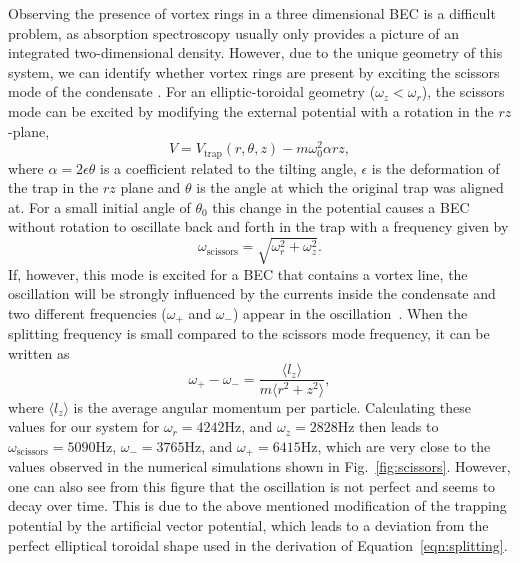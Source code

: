 Observing the presence of vortex rings in a three dimensional BEC is a difficult problem, as absorption spectroscopy usually only provides a picture of an integrated two-dimensional density.
However, due to the unique geometry of this system, we can identify whether vortex rings are present by exciting the scissors mode of the condensate \cite{cozzini2003, guery1999, marago2000}. 
For an elliptic-toroidal geometry ($\omega_z < \omega_r$), the scissors mode can be excited by modifying the external potential with a rotation in the $rz$-plane,
\begin{equation}
        V = V_{\text{trap}}(r, \theta, z) -m\omega_0^2\alpha rz,
\end{equation}
where $\alpha = 2\epsilon\theta$ is a coefficient related to the tilting angle, $\epsilon$ is the deformation of the trap in the $rz$ plane and $\theta$ is the angle at which the original trap was aligned at.
For a small initial angle of $\theta_0$ this change in the potential causes a BEC without rotation to oscillate back and forth in the trap with a frequency given by \cite{stringari2001}
\begin{equation}
        \omega_{\text{scissors}} = \sqrt{\omega_r^2+\omega_z^2}.
\end{equation}
If, however, this mode is excited for a BEC that contains a vortex line, the oscillation will be strongly influenced by the currents inside the condensate and two different frequencies ($\omega_+$ and $\omega_-$) appear in the oscillation~\cite{smith2004, zambelli1998, stringari2001}.
When the splitting frequency is small compared to the scissors mode frequency, it 
can be written as \cite{zambelli1998}
\begin{equation}
\omega_{+} - \omega_{-} = \frac{\langle l_z \rangle}{m\langle r^2 + z^2 \rangle},
\label{eqn:splitting}
\end{equation}
where $\langle l_z \rangle$ is the average angular momentum per particle.
Calculating these values for our system for $\omega_r = 4242$Hz, and $\omega_z = 2828$Hz then leads to $\omega_{\text{scissors}} = 5090$Hz, $\omega_{-} = 3765$Hz, and $\omega_{+} = 6415$Hz, which are very close to the values observed in the numerical simulations shown in Fig.~\ref{fig:scissors}.
However, one can also see from this figure that the oscillation is not perfect and seems to decay over time.
This is due to the above mentioned modification of the trapping potential by the artificial vector potential, which leads to a deviation from the perfect elliptical toroidal shape used in the derivation of Equation~\eqref{eqn:splitting}.

